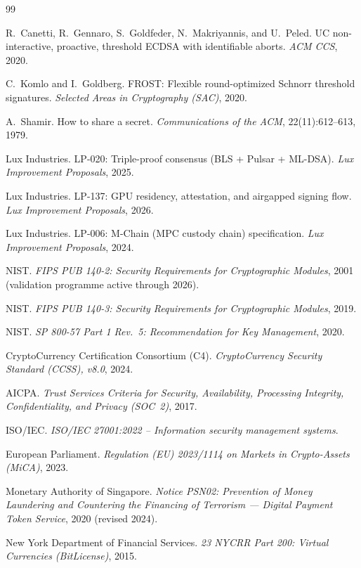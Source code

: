\documentclass[11pt,a4paper]{article}
\begin{document}

\begin{thebibliography}{99}

R.~Canetti, R.~Gennaro, S.~Goldfeder, N.~Makriyannis, and U.~Peled.
UC non-interactive, proactive, threshold ECDSA with identifiable
aborts. \emph{ACM CCS}, 2020.

C.~Komlo and I.~Goldberg. FROST: Flexible round-optimized Schnorr
threshold signatures. \emph{Selected Areas in Cryptography (SAC)}, 2020.

A.~Shamir. How to share a secret. \emph{Communications of the ACM},
22(11):612--613, 1979.

Lux Industries. LP-020: Triple-proof consensus (BLS + Pulsar +
ML-DSA). \emph{Lux Improvement Proposals}, 2025.

Lux Industries. LP-137: GPU residency, attestation, and airgapped
signing flow. \emph{Lux Improvement Proposals}, 2026.

Lux Industries. LP-006: M-Chain (MPC custody chain) specification.
\emph{Lux Improvement Proposals}, 2024.

NIST. \emph{FIPS PUB 140-2: Security Requirements for Cryptographic
Modules}, 2001 (validation programme active through 2026).

NIST. \emph{FIPS PUB 140-3: Security Requirements for Cryptographic
Modules}, 2019.

NIST. \emph{SP 800-57 Part 1 Rev.~5: Recommendation for Key
Management}, 2020.

CryptoCurrency Certification Consortium (C4). \emph{CryptoCurrency
Security Standard (CCSS), v8.0}, 2024.

AICPA. \emph{Trust Services Criteria for Security, Availability,
Processing Integrity, Confidentiality, and Privacy (SOC~2)}, 2017.

ISO/IEC. \emph{ISO/IEC 27001:2022 -- Information security management
systems}.

European Parliament. \emph{Regulation (EU) 2023/1114 on Markets in
Crypto-Assets (MiCA)}, 2023.

Monetary Authority of Singapore. \emph{Notice PSN02: Prevention of
Money Laundering and Countering the Financing of Terrorism --- Digital
Payment Token Service}, 2020 (revised 2024).

New York Department of Financial Services. \emph{23 NYCRR Part 200:
Virtual Currencies (BitLicense)}, 2015.


\end{thebibliography}
\end{document}
